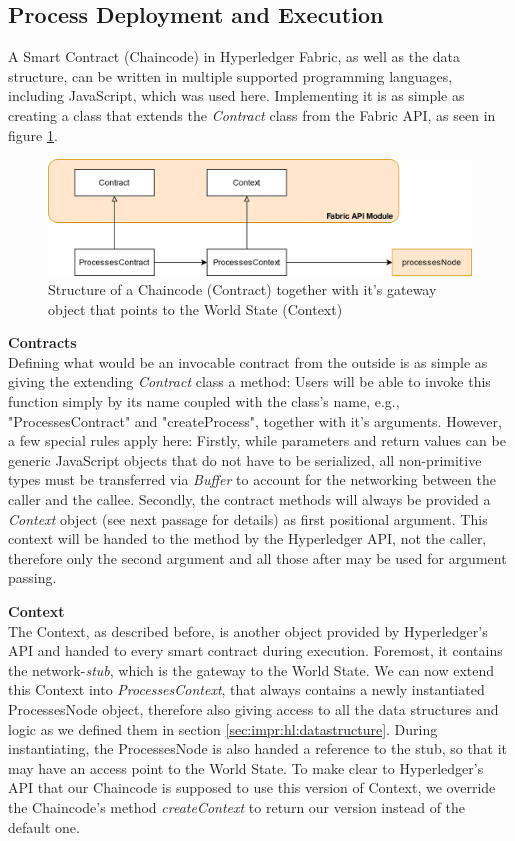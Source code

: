\subsection{Process Deployment and Execution}
\label{sec:impr:hl:chaincode}

A Smart Contract (Chaincode) in Hyperledger Fabric, as well as the data structure, can be written in multiple supported programming languages, including JavaScript, which was used here. Implementing it is as simple as creating a class that extends the \emph{Contract} class from the Fabric API, as seen in figure \ref{fig:impr:hl:contract}.

\begin{figure}[h]
	\centering
	\captionsetup{justification=centering,margin=2cm}
	\includegraphics[width=\textwidth]{gfx/hl-contract}
	\caption{Structure of a Chaincode (Contract) together with it's gateway object that points to the World State (Context)}
	\label{fig:impr:hl:contract}
\end{figure}

\textbf{Contracts} \\[0.2em]
Defining what would be an invocable contract from the outside is as simple as giving the extending \emph{Contract} class a method: Users will be able to invoke this function simply by its name coupled with the class's name, e.g., "ProcessesContract" and "createProcess", together with it's arguments. However, a few special rules apply here: Firstly, while parameters and return values can be generic JavaScript objects that do not have to be serialized, all non-primitive types must be transferred via \emph{Buffer} to account for the networking between the caller and the callee. Secondly, the contract methods will always be provided a \emph{Context} object (see next passage for details) as first positional argument. This context will be handed to the method by the Hyperledger API, not the caller, therefore only the second argument and all those after may be used for argument passing.

\textbf{Context} \\[0.2em]
The Context, as described before, is another object provided by Hyperledger's API and handed to every smart contract during execution. Foremost, it contains the network-\emph{stub}, which is the gateway to the World State. We can now extend this Context into \emph{ProcessesContext}, that always contains a newly instantiated ProcessesNode object, therefore also giving access to all the data structures and logic as we defined them in section \ref{sec:impr:hl:datastructure}. During instantiating, the ProcessesNode is also handed a reference to the stub, so that it may have an access point to the World State. To make clear to Hyperledger's API that our Chaincode is supposed to use this version of Context, we override the Chaincode's method \emph{createContext} to return our version instead of the default one. 

